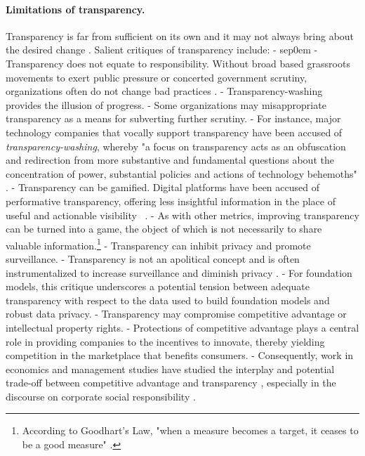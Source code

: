 \documentclass[screen, authorversion, acmsmall]{acmart}
\begin{document}
\paragraph{Limitations of transparency.} 
Transparency is far from sufficient on its own and it may not always bring about the desired change \citep{corbett2023interrogating}. 
Salient critiques of transparency include:
- sep0em
-  Transparency does not equate to responsibility. Without broad based grassroots movements to exert public pressure or concerted government scrutiny, organizations often do not change bad practices \citep{boyd2016algorithmic,ananny2016limits}.
-  Transparency-washing provides the illusion of progress.
- Some organizations may misappropriate transparency as a means for subverting further scrutiny.
- For instance, major technology companies that vocally support transparency have been accused of \emph{transparency-washing}, whereby "a focus on transparency acts as an obfuscation and redirection from more substantive and fundamental questions about the concentration of power, substantial policies and actions of technology behemoths" \citep{zalnieriute2021transparency}.
-  Transparency can be gamified. Digital platforms have been accused of performative transparency, offering less insightful information in the place of useful and actionable visibility ~\citep{doi:10.1177/20539517231164119, Mittelstadt2019}.
- As with other metrics, improving transparency can be turned into a game, the object of which is not necessarily to share valuable information.\footnote{According to Goodhart's Law, "when a measure becomes a target, it ceases to be a good measure" \citep{goodhart1984problems}.}
-  Transparency can inhibit privacy and promote surveillance.
- Transparency is not an apolitical concept and is often instrumentalized to increase surveillance and diminish privacy \citep{han2015transparency,Mohamed2020,birchall2021radical}.
- For foundation models, this critique underscores a potential tension between adequate transparency with respect to the data used to build foundation models and robust data privacy.
-  Transparency may compromise competitive advantage or intellectual property rights.
- Protections of competitive advantage plays a central role in providing companies to the incentives to innovate, thereby yielding competition in the marketplace that benefits consumers.
- Consequently, work in economics and management studies have studied the interplay and potential trade-off between competitive advantage and transparency \citep{bloomfield1999market, granados2013transparency, liu2023competitive}, especially in the discourse on corporate social responsibility \citep{}.
\end{document}
